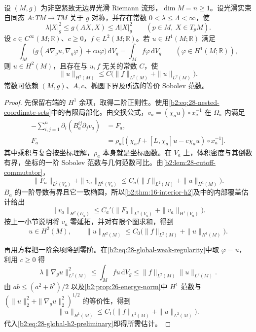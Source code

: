 \begin{theorem}[紧流形上的二阶估计]\label{b2:thm:28-global-h2}
设 \((M,g)\) 为非空紧致无边界光滑 Riemann 流形，\(\dim M=n\geq1\)。设光滑实束自同态 \(A:TM\to TM\) 关于 \(g\) 对称，并存在常数 \(0<\lambda\leq\Lambda<\infty\)，使
\[
 \lambda |X|_g^2\leq g(AX,X)\leq\Lambda |X|_g^2
 \qquad(p\in M,\ X\in T_pM).
\]
设 \(c\in C^\infty(M;\mathbb R)\)、\(c\geq0\)，\(f\in L^2(M;\mathbb R)\)。若 \(u\in H^1(M;\mathbb R)\) 满足
\begin{equation}\label{b2:eq:28-global-weak-regularity}
 \int_M\bigl(g(A\nabla_g u,\nabla_g\varphi)+cu\varphi\bigr)\,\mathrm dV_g
 =\int_M f\varphi\,\mathrm dV_g
 \qquad(\varphi\in H^1(M;\mathbb R)),
\end{equation}
则 \(u\in H^2(M)\)，且存在与 \(u,f\) 无关的常数 \(C\)，使
\begin{equation}\label{b2:eq:28-global-h2}
 \|u\|_{H^2(M)}\leq C\bigl(\|f\|_{L^2(M)}+\|u\|_{L^2(M)}\bigr).
\end{equation}
常数可依赖 \((M,g)\)、\(A,c\)、椭圆下界及所选的等价 Sobolev 范数。
\end{theorem}
\begin{proof}
先保留右端的 \(H^1\) 余项，取得二阶正则性。使用\eqref{b2:eq:28-nested-coordinate-sets}中的有限局部化。由交换公式，\(v_a=(\chi_a u)\circ x_a^{-1}\) 在 \(\Omega_a\) 内满足
\begin{equation}\label{b2:eq:28-localized-equation}
 \begin{aligned}
 -\sum_{i,j=1}^n\partial_i(B_a^{ij}\partial_jv_a)&=F_a,\\
 F_a&=\rho_a\bigl[(\chi_a f+[L,\chi_a]u-c\chi_a u)\circ x_a^{-1}\bigr].
 \end{aligned}
\end{equation}
其中乘积与复合按坐标理解，\(\rho_a\) 本身就是坐标函数。在 \(V_a\) 上，体积密度与其倒数有界，坐标的一阶 Sobolev 范数与几何范数可比。由\cref{b2:lem:28-cutoff-commutator}，
\[
 \|F_a\|_{L^2(V_a)}+\|v_a\|_{H^1(V_a)}
 \leq C_a\bigl(\|f\|_{L^2(M)}+\|u\|_{H^1(M)}\bigr).
\]
\(B_a\) 的一阶导数有界且它一致椭圆，所以\cref{b2:thm:16-interior-h2}及中的内部覆盖估计给出
\[
 \|v_a\|_{H^2(U_a)}
 \leq C_a'\bigl(\|F_a\|_{L^2(V_a)}+\|v_a\|_{H^1(V_a)}\bigr).
\]
按上一小节说明将 \(v_a\) 零延拓，并对有限个图求和，得到
\begin{equation}\label{b2:eq:28-global-h2-preliminary}
 u\in H^2(M),\qquad
 \|u\|_{H^2(M)}\leq C_0\bigl(\|f\|_{L^2(M)}+\|u\|_{H^1(M)}\bigr).
\end{equation}

再用方程把一阶余项降到零阶。在\eqref{b2:eq:28-global-weak-regularity}中取 \(\varphi=u\)，利用 \(c\geq0\) 得
\[
 \lambda\|\nabla_g u\|_{L^2(M)}^2
 \leq\int_Mfu\,\mathrm dV_g
 \leq\|f\|_{L^2(M)}\|u\|_{L^2(M)}.
\]
由 \(ab\leq(a^2+b^2)/2\) 以及\cref{b2:prop:26-energy-norm}中 \(H^1\) 范数与
\((\|u\|_2^2+\|\nabla_g u\|_2^2)^{1/2}\) 的等价性，得到
\[
 \|u\|_{H^1(M)}\leq C_1\bigl(\|f\|_{L^2(M)}+\|u\|_{L^2(M)}\bigr).
\]
代入\eqref{b2:eq:28-global-h2-preliminary}即得所需估计。
\end{proof}

